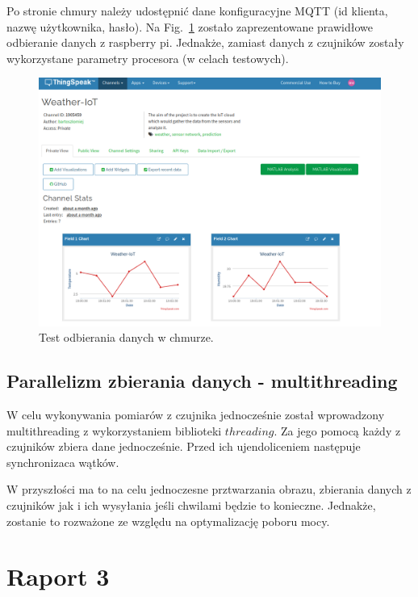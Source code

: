 \documentclass{article}
\begin{document}
Po stronie chmury należy udostępnić dane konfiguracyjne MQTT (id klienta, nazwę użytkownika, hasło). Na Fig.~\ref{fig:2} zostało zaprezentowane prawidłowe odbieranie danych z raspberry pi. Jednakże, zamiast danych z czujników zostały wykorzystane parametry procesora (w celach testowych).
\begin{figure}
  \centering
  \includegraphics[width=\textwidth]{chumra.png}
  \caption{Test odbierania danych w chmurze.}
  \label{fig:2}    
\end{figure}
\subsection{Parallelizm zbierania danych - multithreading}
W celu wykonywania pomiarów z czujnika jednocześnie został wprowadzony multithreading z wykorzystaniem biblioteki $threading$. Za jego pomocą każdy z czujników zbiera dane jednocześnie. Przed ich ujendoliceniem następuje synchronizaca wątków.

W przyszłości ma to na celu jednoczesne prztwarzania obrazu, zbierania danych z czujników jak i ich wysyłania jeśli chwilami będzie to konieczne. Jednakże, zostanie to rozważone ze względu na optymalizację poboru mocy.
\newpage
\section{Raport 3}
\end{document}
